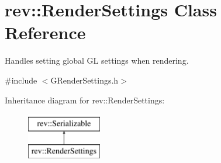 \hypertarget{classrev_1_1_render_settings}{}\section{rev\+::Render\+Settings Class Reference}
\label{classrev_1_1_render_settings}


Handles setting global GL settings when rendering.  




{\ttfamily \#include $<$G\+Render\+Settings.\+h$>$}

Inheritance diagram for rev\+::Render\+Settings\+:\begin{figure}[H]
\begin{center}
\leavevmode
\includegraphics[height=2.000000cm]{classrev_1_1_render_settings}
\end{center}
\end{figure}
